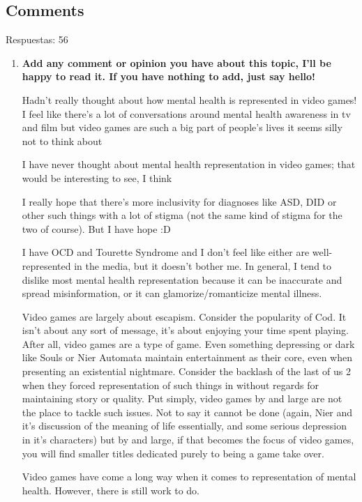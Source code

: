 \documentclass[12pt, a4paper,twoside,titlepage]{book}
\begin{document}
\subsection{Comments}
Respuestas: 56
\begin{enumerate}[label=\textbf{\arabic*}.]
     \item \textbf{Add any comment or opinion you have about this topic, I'll be happy to read it. If you have nothing to add, just say hello!}\\
     \label{comentariosIngles}
     
        Hadn’t really thought about how mental health is represented in video games! I feel like there’s a lot of conversations around mental health awareness in tv and film but video games are such a big part of people’s lives it seems silly not to think about
        
        I have never thought about mental health representation in video games; that would be interesting to see, I think
        
        I really hope that there's more inclusivity for diagnoses like ASD, DID or other such things with a lot of stigma (not the same kind of stigma for the two of course). But I have hope :D 
        
        I have OCD and Tourette Syndrome and I don't feel like either are well-represented in the media, but it doesn't bother me. In general, I tend to dislike most mental health representation because it can be inaccurate and spread misinformation, or it can glamorize/romanticize mental illness.
        
        Video games are largely about escapism. Consider the popularity of Cod. It isn't about any sort of message, it's about enjoying your time spent playing. After all, video games are a type of game. Even something depressing or dark like Souls or Nier Automata maintain entertainment as their core, even when presenting an existential nightmare. Consider the backlash of the last of us 2 when they forced representation of such things in without regards for maintaining story or quality. Put simply, video games by and large are not the place to tackle such issues. Not to say it cannot be done (again, Nier and it's discussion of the meaning of life essentially, and some serious depression in it's characters) but by and large, if that becomes the focus of video games, you will find smaller titles dedicated purely to being a game take over.
        
        Video games have come a long way when it comes to representation of mental health. However, there is still work to do.
        

\end{enumerate}
\end{document}
